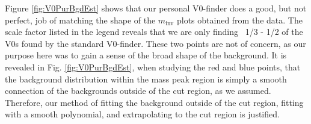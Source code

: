 \documentclass[../AnalysisNoteJBuxton.tex]{subfiles}
\begin{document}
Figure \ref{fig:V0PurBgdEst} shows that our personal V0-finder does a good, but not perfect, job of matching the shape of the $m_{\mathrm{inv}}$ plots obtained from the data.  The scale factor listed in the legend reveals that we are only finding ~1/3 - 1/2 of the V0s found by the standard V0-finder.  These two points are not of concern, as our purpose here was to gain a sense of the broad shape of the background.  It is revealed in Fig. \ref{fig:V0PurBgdEst}, when studying the red and blue points, that the background distribution within the mass peak region is simply a smooth connection of the backgrounds outside of the cut region, as we assumed.  Therefore, our method of fitting the background outside of the cut region, fitting with a smooth polynomial, and extrapolating to the cut region is justified.
\end{document}
